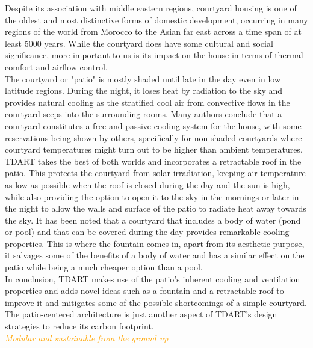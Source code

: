 \documentclass[justified]{tufte-book}
\begin{document}
	Despite its association with middle eastern regions, courtyard housing is one of the oldest and most distinctive forms of domestic development, occurring in many regions of the world from Morocco to the Asian far east across a time span of at least 5000 years\cite{edwards2006courtyard}. While the courtyard does have some cultural and social significance, more important to us is its impact on the house in terms of thermal comfort and airflow control.\\
	The courtyard or "patio" is mostly shaded until late in the day even in low latitude regions. During the night, it loses heat by radiation to the sky\cite{batty1991natural} and provides natural cooling as the stratified cool air from convective flows in the courtyard seeps into the surrounding rooms. Many authors\cite{scudo1988climatic,fathy1986natural} conclude that a courtyard constitutes a free and passive cooling system for the house, with some reservations being shown by others\cite{etzion1990thermal}, specifically for non-shaded courtyards where courtyard temperatures might turn out to be higher than ambient temperatures. TDART takes the best of both worlds and incorporates a retractable roof in the patio. This protects the courtyard from solar irradiation, keeping air temperature as low as possible when the roof is closed during the day and the sun is high, while also providing the option to open it to the sky in the mornings or later in the night to allow the walls and surface of the patio to radiate heat away towards the sky. It has been noted that a courtyard that includes a body of water (pond or pool) and that can be covered during the day provides remarkable cooling properties\cite{al2001effect}. This is where the fountain comes in, apart from its aesthetic purpose, it salvages some of the benefits of a body of water and has a similar effect on the patio while being a much cheaper option than a pool.\\
	In conclusion, TDART makes use of the patio's inherent cooling and ventilation properties and adds novel ideas such as a fountain and a retractable roof to improve it and mitigates some of the possible shortcomings of a simple courtyard. The patio-centered architecture is just another aspect of TDART's design strategies to reduce its carbon footprint.
		\vspace*{2cm}\\
	\textcolor{orange}{\textit{\Huge{Modular and sustainable from the ground up}}}
		\vspace*{2cm}\\
\end{document}
